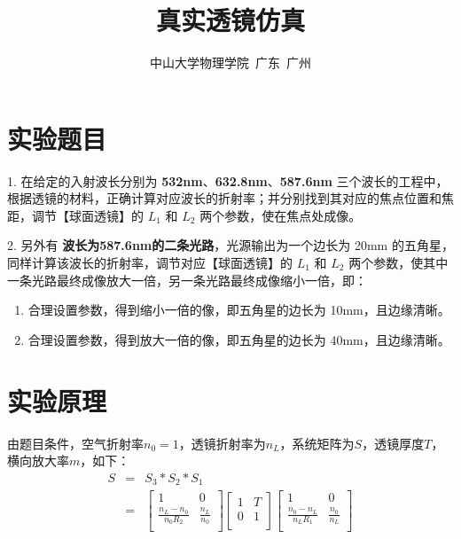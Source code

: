 \documentclass[a4paper,8pt,twocolumn]{article}
\begin{document}
\title{
  \textbf{\huge 真实透镜仿真}}
\author{
\small 中山大学物理学院~广东~广州
}

\maketitle

\section{实验题目}
 1. 在给定的入射波长分别为 \textbf{532nm}、\textbf{632.8nm}、\textbf{587.6nm} 三个波长的工程中，  
 根据透镜的材料，正确计算对应波长的折射率；并分别找到其对应的焦点位置和焦距，调节【球面透镜】的 $L_1$ 和 $L_2$ 两个参数，使在焦点处成像。

 2. 另外有 \textbf{波长为587.6nm的二条光路}，光源输出为一个边长为 20mm 的五角星，同样计算该波长的折射率，调节对应【球面透镜】的 $L_1$ 和 $L_2$ 两个参数，使其中一条光路最终成像放大一倍，另一条光路最终成像缩小一倍，即：
 \begin{enumerate}
  \item 合理设置参数，得到缩小一倍的像，即五角星的边长为 10mm，且边缘清晰。
  \item 合理设置参数，得到放大一倍的像，即五角星的边长为 40mm，且边缘清晰。
 \end{enumerate}

\section{实验原理}
 由题目条件，空气折射率$n_0 = 1$，透镜折射率为$n_L$，系统矩阵为$S$，透镜厚度$T$，横向放大率$m$，如下：
 \begin{eqnarray*}
    S &=& S_3*S_2*S_1 \\
      &=&
    \left[
    \begin{array}{cc}
     1 & 0 \\
     \frac{n_L-n_0}{n_0R_2} & \frac{n_L}{n_0} \\
    \end{array}
    \right]
    \left[
    \begin{array}{cc}
     1 & T \\
     0 & 1 \\
    \end{array}
    \right]
    \left[
    \begin{array}{cc}
     1 & 0 \\
     \frac{n_0-n_L}{n_LR_1} & \frac{n_0}{n_L} \\
    \end{array}
    \right] \\
 \end{eqnarray*}
\end{document}
